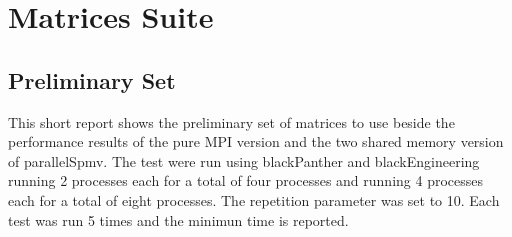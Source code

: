 \section{Matrices Suite} \label{matricesSuite}





\subsection*{Preliminary Set}
This short report shows the preliminary set of matrices to use beside the performance results of the pure MPI version and the two shared memory version of parallelSpmv. The test were run using blackPanther and blackEngineering running 2 processes each for a total of four processes and running 4 processes each for a total of eight processes. The repetition parameter was set to 10. Each test was run 5 times and the minimun time is reported.


\medskip

